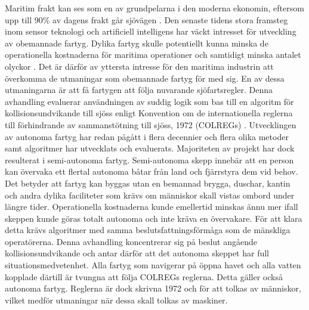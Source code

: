 \renewcommand{\thesection}{\arabic{section}}
\label{app:swed_sum} %

Maritim frakt kan ses som en av grundpelarna i den moderna ekonomin, eftersom upp till 90\% av dagens frakt går sjövägen \cite{percent_trade}. Den senaste tidens stora framsteg inom sensor teknologi och artificiell intelligens har väckt intresset för utveckling av obemannade fartyg. Dylika fartyg skulle  potentiellt kunna minska de operationella kostnaderna för maritima operationer och samtidigt minska antalet olyckor \cite{manley2008unmanned,marine_casualities_incidents_2017}. Det är därför av yttersta intresse för den maritima industrin att överkomma de utmaningar som obemannade fartyg för med sig. En av dessa utmaningarna är att få fartygen att följa nuvarande sjöfartsregler. Denna avhandling  evaluerar användningen av suddig logik som bas till en algoritm för kollisionsundvikande till sjöss enligt Konvention om de internationella reglerna till förhindrande av sammanstötning till sjöss, 1972 (COLREGs) \cite{colreg}.
Utvecklingen av autonoma fartyg har redan pågått i flera decennier och flera olika metoder samt algoritmer har utvecklats och evaluerats. Majoriteten av projekt har dock resulterat i semi-autonoma fartyg. Semi-autonoma skepp innebär att en person kan övervaka ett flertal autonoma båtar från land och fjärrstyra dem vid behov. Det betyder att fartyg kan byggas utan en bemannad brygga, duschar, kantin och andra dylika faciliteter som krävs om människor skall vistas ombord under längre tider. Operationella kostnaderna kunde emellertid minskas ännu mer ifall skeppen kunde göras totalt autonoma och inte kräva en övervakare. För att klara detta krävs algoritmer med samma beslutsfattningsförmåga som de mänskliga operatörerna. Denna avhandling koncentrerar sig på beslut angående kollisionsundvikande och antar därför att det autonoma skeppet har full situationsmedvetenhet.
Alla fartyg som navigerar på öppna havet och alla vatten kopplade därtill är tvungna att följa COLREGs reglerna. Detta gäller också autonoma fartyg. Reglerna är dock skrivna 1972 och för att tolkas av människor, vilket medför utmaningar när dessa skall tolkas av maskiner.

